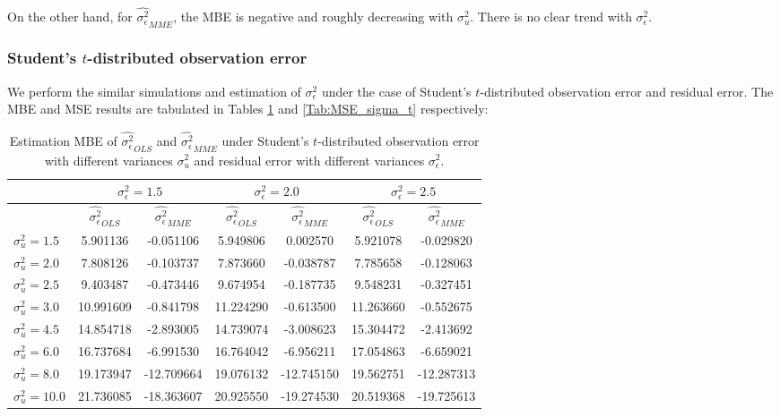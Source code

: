 \documentclass{article}
\begin{document}
On the other hand, for $\hat{\sigma^2_\epsilon}_{MME}$, the MBE is negative and roughly decreasing with $\sigma^2_u$. There is no clear trend with $\sigma^2_\epsilon$. 


\subsubsection{Student's $t$-distributed observation error}

We perform the similar simulations and estimation of $\sigma^2_\epsilon$ under the case of Student's $t$-distributed observation error and residual error.
The MBE and MSE results are tabulated in Tables \ref{Tab:MBE_sigma_t} and \ref{Tab:MSE_sigma_t} respectively:

\begin{table}[ht]
    \centering
    \caption{Estimation MBE of $\hat{\sigma^2_\epsilon}_{OLS}$ and $\hat{\sigma^2_\epsilon}_{MME}$ under Student's $t$-distributed observation error with different variances $\sigma^2_u$ and residual error with different variances $\sigma^2_\epsilon$.}
    \label{Tab:MBE_sigma_t}
    \begin{tabular}[t]{lcccccc}
        \hline
        &\multicolumn{2}{c}{$\sigma^2_\epsilon=1.5$}&\multicolumn{2}{c}{$\sigma^2_\epsilon=2.0$}&\multicolumn{2}{c}{$\sigma^2_\epsilon=2.5$}\\
        \hline
        &$\hat{\sigma^2_\epsilon}_{OLS}$&$\hat{\sigma^2_\epsilon}_{MME}$&$\hat{\sigma^2_\epsilon}_{OLS}$&
        $\hat{\sigma^2_\epsilon}_{MME}$&$\hat{\sigma^2_\epsilon}_{OLS}$&$\hat{\sigma^2_\epsilon}_{MME}$\\
        \hline
        $\sigma^2_u = 1.5$&5.901136&-0.051106&5.949806&0.002570&5.921078&-0.029820\\
        $\sigma^2_u = 2.0$&7.808126&-0.103737&7.873660&-0.038787&7.785658&-0.128063\\
        $\sigma^2_u = 2.5$&9.403487&-0.473446&9.674954&-0.187735&9.548231&-0.327451\\
        $\sigma^2_u = 3.0$&10.991609&-0.841798&11.224290&-0.613500&11.263660&-0.552675\\
        $\sigma^2_u = 4.5$&14.854718&-2.893005&14.739074&-3.008623&15.304472&-2.413692\\
        $\sigma^2_u = 6.0$&16.737684&-6.991530&16.764042&-6.956211&17.054863&-6.659021\\
        $\sigma^2_u = 8.0$&19.173947&-12.709664&19.076132&-12.745150&19.562751&-12.287313\\
        $\sigma^2_u = 10.0$&21.736085&-18.363607&20.925550&-19.274530&20.519368&-19.725613\\ 
        \hline
    \end{tabular}
\end{table}
\end{document}
